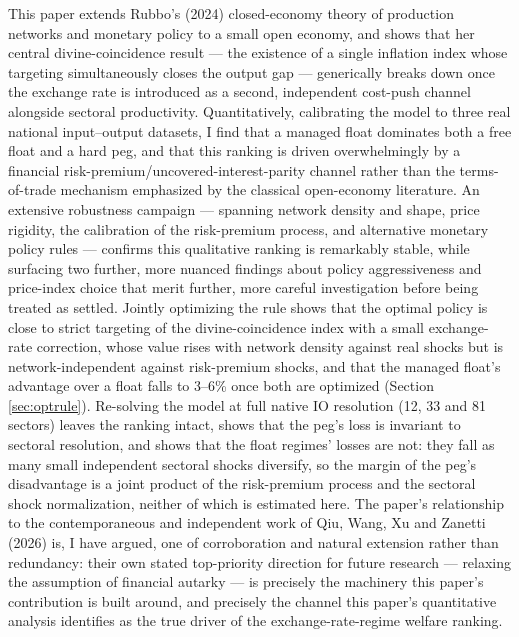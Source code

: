\documentclass[12pt]{article}
\begin{document}
This paper extends Rubbo's (2024) closed-economy theory of production networks and monetary policy to
a small open economy, and shows that her central divine-coincidence result --- the existence of a
single inflation index whose targeting simultaneously closes the output gap --- generically breaks
down once the exchange rate is introduced as a second, independent cost-push channel alongside
sectoral productivity. Quantitatively, calibrating the model to three real national input--output
datasets, I find that a managed float dominates both a free float and a hard peg, and that this
ranking is driven overwhelmingly by a financial risk-premium/uncovered-interest-parity channel rather
than the terms-of-trade mechanism emphasized by the classical open-economy literature. An extensive
robustness campaign --- spanning network density and shape, price rigidity, the calibration of the
risk-premium process, and alternative monetary policy rules --- confirms this qualitative ranking is
remarkably stable, while surfacing two further, more nuanced findings about policy aggressiveness and
price-index choice that merit further, more careful investigation before being treated as settled.
Jointly optimizing the rule shows that the optimal policy is close to strict targeting of the divine-coincidence index with a small exchange-rate correction, whose value rises with network density against real shocks but is network-independent against risk-premium shocks, and that the managed float's advantage over a float falls to 3--6\% once both are optimized (Section \ref{sec:optrule}). Re-solving the model at full native IO resolution (12, 33 and 81 sectors) leaves the ranking intact,
shows that the peg's loss is invariant to sectoral resolution, and shows that the float regimes' losses
are not: they fall as many small independent sectoral shocks diversify, so the margin of the peg's
disadvantage is a joint product of the risk-premium process and the sectoral shock normalization, neither
of which is estimated here.
The paper's relationship to the contemporaneous and independent work of Qiu, Wang, Xu and Zanetti
(2026) is, I have argued, one of corroboration and natural extension rather than redundancy: their own
stated top-priority direction for future research --- relaxing the assumption of financial autarky ---
is precisely the machinery this paper's contribution is built around, and precisely the channel this
paper's quantitative analysis identifies as the true driver of the exchange-rate-regime welfare
ranking.

\newpage
\end{document}
